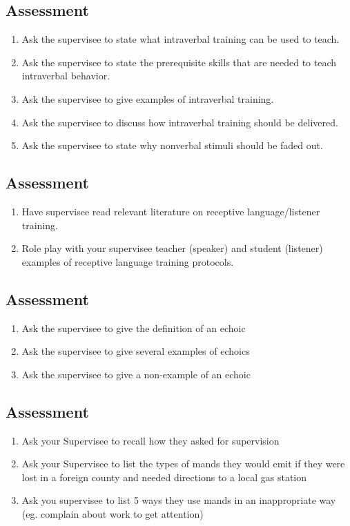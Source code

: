 \subsection{Assessment}
\begin{enumerate}
\item Ask the supervisee to state what intraverbal training can be used to teach.
\item Ask the supervisee to state the prerequisite skills that are needed to teach intraverbal behavior.  
\item Ask the supervisee to give examples of intraverbal training.
\item Ask the supervisee to discuss how intraverbal training should be delivered.
\item Ask the supervisee to state why nonverbal stimuli should be faded out.
\end{enumerate}
%
\subsection{Assessment}
\begin{enumerate}
\item Have supervisee read relevant literature on receptive language/listener training.
\item Role play with your supervisee teacher (speaker) and student (listener) examples of receptive language training protocols.
\end{enumerate}
%
\subsection{Assessment}
\begin{enumerate}
\item Ask the supervisee to give the definition of an echoic
\item Ask the supervisee to give several examples of echoics
\item Ask the supervisee to give a non-example of an echoic 
%
\end{enumerate}
%
\subsection{Assessment}
\begin{enumerate}
\item Ask your Supervisee to recall how they asked for supervision
\item Ask your Supervisee to list the types of mands they would emit if they were lost in a foreign county and needed directions to a local gas station
\item Ask you supervisee to list 5 ways they use mands in an inappropriate way (eg. complain about work to get attention)
%
\end{enumerate}
%
